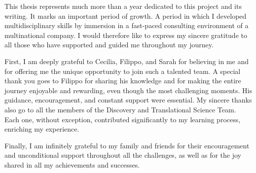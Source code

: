 ﻿%

%

\begin{ntacknowledgements}

This thesis represents much more than a year dedicated to this project and its writing. It marks an important period of growth. A period in which I developed multidisciplinary skills by immersion in a fast-paced consulting environment of a multinational company. I would therefore like to express my sincere gratitude to all those who have supported and guided me throughout my journey. 

First, I am deeply grateful to Cecilia, Filippo, and Sarah for believing in me and for offering me the unique opportunity to join such a talented team. A special thank you goes to Filippo for sharing his knowledge and for making the entire journey enjoyable and rewarding, even though the most challenging moments. His guidance, encouragement, and constant support were essential. My sincere thanks also go to all the members of the Discovery and Translational Science Team. Each one, without exception, contributed significantly to my learning process, enriching my experience.

Finally, I am infinitely grateful to my family and friends for their encouragement and unconditional support throughout all the challenges, as well as for the joy shared in all my achievements and successes.


\end{ntacknowledgements}
